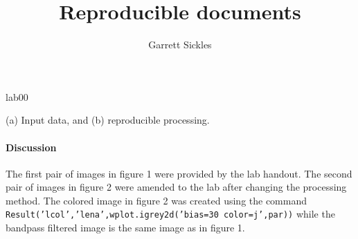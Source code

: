 
\def\thisdoc{lab00}
\def\exedirs{lena}

\author{Garrett Sickles}
\title{Reproducible documents}{\thisdoc}

%

%



{(a) Input data, and (b) reproducible processing.}
\newpage
\paragraph{Discussion} The first pair of images in figure 1 were provided by the lab handout. The second pair of images in figure 2 were amended to the lab after changing the processing method. The colored image in figure 2 was created using the command \texttt{Result('lcol','lena',wplot.igrey2d('bias=30 color=j',par))} while the bandpass filtered image is the same image as in figure 1.
%

\tiny
\clearpage 

\normalsize
